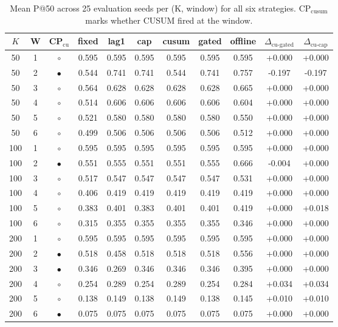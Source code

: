 \begin{table}[!t]
  \caption{Mean P@50 across 25 evaluation seeds per (K, window) for all six strategies. CP$_{\mathrm{cusum}}$ marks whether CUSUM fired at the window.}
  \label{tab:main}
  \centering
  \small
  \setlength{\tabcolsep}{4pt}
  \begin{tabular}{cc c cccccc cc}
    \toprule
    $K$ & W & CP$_{\text{cu}}$ & fixed & lag1 & cap & cusum & gated & offline & $\Delta_{\text{cu-gated}}$ & $\Delta_{\text{cu-cap}}$ \\
    \midrule
    50 & 1 & $\circ$ & 0.595 & 0.595 & 0.595 & 0.595 & 0.595 & 0.595 & +0.000 & +0.000 \\
    50 & 2 & $\bullet$ & 0.544 & 0.741 & 0.741 & 0.544 & 0.741 & 0.757 & -0.197 & -0.197 \\
    50 & 3 & $\circ$ & 0.564 & 0.628 & 0.628 & 0.628 & 0.628 & 0.665 & +0.000 & +0.000 \\
    50 & 4 & $\circ$ & 0.514 & 0.606 & 0.606 & 0.606 & 0.606 & 0.604 & +0.000 & +0.000 \\
    50 & 5 & $\circ$ & 0.521 & 0.580 & 0.580 & 0.580 & 0.580 & 0.550 & +0.000 & +0.000 \\
    50 & 6 & $\circ$ & 0.499 & 0.506 & 0.506 & 0.506 & 0.506 & 0.512 & +0.000 & +0.000 \\
    \midrule
    100 & 1 & $\circ$ & 0.595 & 0.595 & 0.595 & 0.595 & 0.595 & 0.595 & +0.000 & +0.000 \\
    100 & 2 & $\bullet$ & 0.551 & 0.555 & 0.551 & 0.551 & 0.555 & 0.666 & -0.004 & +0.000 \\
    100 & 3 & $\circ$ & 0.517 & 0.547 & 0.547 & 0.547 & 0.547 & 0.531 & +0.000 & +0.000 \\
    100 & 4 & $\circ$ & 0.406 & 0.419 & 0.419 & 0.419 & 0.419 & 0.419 & +0.000 & +0.000 \\
    100 & 5 & $\circ$ & 0.383 & 0.401 & 0.383 & 0.401 & 0.401 & 0.419 & +0.000 & +0.018 \\
    100 & 6 & $\circ$ & 0.315 & 0.355 & 0.355 & 0.355 & 0.355 & 0.346 & +0.000 & +0.000 \\
    \midrule
    200 & 1 & $\circ$ & 0.595 & 0.595 & 0.595 & 0.595 & 0.595 & 0.595 & +0.000 & +0.000 \\
    200 & 2 & $\bullet$ & 0.518 & 0.458 & 0.518 & 0.518 & 0.518 & 0.556 & +0.000 & +0.000 \\
    200 & 3 & $\bullet$ & 0.346 & 0.269 & 0.346 & 0.346 & 0.346 & 0.395 & +0.000 & +0.000 \\
    200 & 4 & $\circ$ & 0.254 & 0.289 & 0.254 & 0.289 & 0.254 & 0.284 & +0.034 & +0.034 \\
    200 & 5 & $\circ$ & 0.138 & 0.149 & 0.138 & 0.149 & 0.138 & 0.145 & +0.010 & +0.010 \\
    200 & 6 & $\bullet$ & 0.075 & 0.075 & 0.075 & 0.075 & 0.075 & 0.075 & +0.000 & +0.000 \\
    \bottomrule
  \end{tabular}
\end{table}
